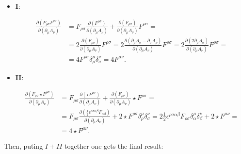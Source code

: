 \begin{itemize}
	\item \textbf{I}:
	
	\begin{equation}
		\begin{split}
			\frac{\partial\left(F_{\rho \sigma} F^{\rho \sigma}\right)}{\partial\left(\partial_{\mu} A_{\nu}\right)}&=F_{\rho \sigma} \frac{\partial\left(F^{\rho \sigma}\right)}{\partial\left(\partial_{\mu} A_{\nu}\right)}+\frac{\partial\left(F_{\rho \sigma}\right)}{\partial\left(\partial_{\mu} A_{\nu}\right)} F^{\rho \sigma}=\\
			&=2 \frac{\partial\left(F_{\rho \sigma}\right)}{\partial\left(\partial_{\mu} A_{\nu}\right)} F^{\rho \sigma}=2 \frac{\partial\left(\partial_{\rho} A_{\sigma}-\partial_{\sigma} A_{\rho}\right)}{\partial\left(\partial_{\mu} A_{\nu}\right)} F^{\rho \sigma}=2 \frac{\partial\left(2 \partial_{\rho} A_{\sigma}\right)}{\partial\left(\partial_{\mu} A_{\nu}\right)} F^{\rho \sigma}=\\
			&= 4 F^{\rho \sigma}\delta_{\rho}^{\mu} \delta_{\sigma}^{\nu} = 4 F^{\mu \nu}.
		\end{split}
	\end{equation}

	\item \textbf{II}:

	\begin{equation}
		\begin{split}
			\frac{\partial\left(F_{\rho \sigma} \star F^{\rho \sigma}\right)}{\partial\left(\partial_{\mu} A_{\nu}\right)}&=F_{\rho \sigma} \frac{\partial\left(\star F^{\rho \sigma}\right)}{\partial\left(\partial_{\mu} A_{\nu}\right)}+\frac{\partial\left(F_{\rho \sigma}\right)}{\partial\left(\partial_{\mu} A_{\nu}\right)} \star F^{\rho \sigma}=\\
			&= F_{\rho \sigma} \frac{\partial\left(\frac{1}{2} \epsilon^{\rho \sigma \alpha \beta} F_{\alpha \beta}\right)}{\partial\left(\partial_{\mu} A_{\nu}\right)}+2 \star F^{\rho \sigma}\delta_{\rho}^{\mu}\delta_{\sigma}^{\nu}=2 \frac{1}{2} \epsilon^{\rho \sigma \alpha \beta} F_{\rho \sigma} \delta_{\alpha} ^{\mu}\delta_{\beta}^{\nu}+2 \star F^{\mu \nu} =\\
			&=4 \star F^{\mu \nu}.
		\end{split}
	\end{equation}
\end{itemize}

Then, puting $I + II$ together one gets the final result:

